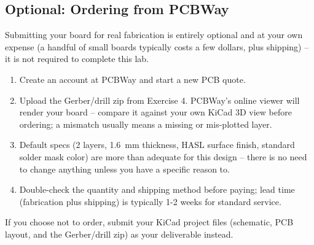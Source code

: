 \documentclass[11pt]{article}
\begin{document}
\subsection*{Optional: Ordering from PCBWay}
Submitting your board for real fabrication is entirely optional and at your own
expense (a handful of small boards typically costs a few dollars, plus shipping) --
it is not required to complete this lab.
\begin{enumerate}[leftmargin=*,nosep]
  \item Create an account at PCBWay and start a new PCB quote.
  \item Upload the Gerber/drill zip from Exercise 4. PCBWay's online viewer will
        render your board -- compare it against your own KiCad 3D view before
        ordering; a mismatch usually means a missing or mis-plotted layer.
  \item Default specs (2 layers, 1.6~mm thickness, HASL surface finish, standard
        solder mask color) are more than adequate for this design -- there is no
        need to change anything unless you have a specific reason to.
  \item Double-check the quantity and shipping method before paying; lead time
        (fabrication plus shipping) is typically 1-2 weeks for standard service.
\end{enumerate}
If you choose not to order, submit your KiCad project files (schematic, PCB layout,
and the Gerber/drill zip) as your deliverable instead.
\end{document}
